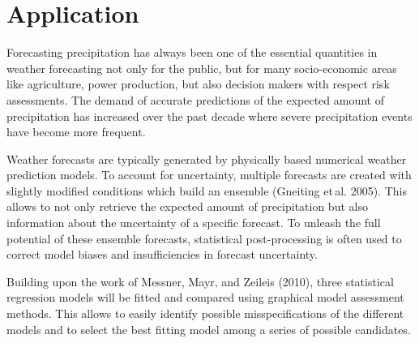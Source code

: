 \documentclass[twoside]{report}
\begin{document}

\maketitle



\section{Application}

Forecasting precipitation has always been one of the essential quantities in
weather forecasting not only for the public, but for many socio-economic areas
like agriculture, power production, but also decision makers with respect risk
assessments. 
The demand of accurate predictions of the expected amount of precipitation has
increased over the past decade where severe precipitation events have
become more frequent.

Weather forecasts are typically generated by physically based numerical weather
prediction models. To account for uncertainty, multiple forecasts are created
with slightly modified conditions which build an ensemble (Gneiting et\,al.
2005). This allows to not only retrieve the expected amount of precipitation
but also information about the uncertainty of a specific forecast.
To unleash the full potential of these ensemble forecasts, statistical
post-processing is often used to correct model biases and insufficiencies in
forecast uncertainty.

Building upon the work of Messner, Mayr, and Zeileis (2010), three statistical
regression models will be fitted and compared using
graphical model assessment methods.
This allows to easily identify possible misspecifications of the different
models and to select the best fitting model among a series of possible candidates.


\end{document}
